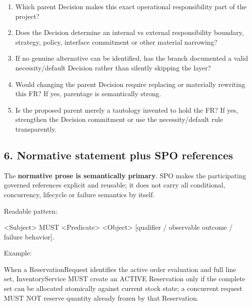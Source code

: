 \documentclass[
  10pt,
]{article}
\newenvironment{Shaded}{}{}
\newcommand{\NormalTok}[1]{#1}
\providecommand{\tightlist}{%
  \setlength{\itemsep}{0pt}\setlength{\parskip}{0pt}}
\begin{document}
\begin{enumerate}
\def\labelenumi{\arabic{enumi}.}
\tightlist
\item
  Which parent Decision makes this exact operational responsibility part
  of the project?
\item
  Does the Decision determine an internal vs external responsibility
  boundary, strategy, policy, interface commitment or other material
  narrowing?
\item
  If no genuine alternative can be identified, has the branch documented
  a valid necessity/default Decision rather than silently skipping the
  layer?
\item
  Would changing the parent Decision require replacing or materially
  rewriting this FR? If yes, parentage is semantically strong.
\item
  Is the proposed parent merely a tautology invented to hold the FR? If
  yes, strengthen the Decision commitment or use the necessity/default
  rule transparently.
\end{enumerate}

\subsection{6. Normative statement plus SPO
references}\label{6-normative-statement-plus-spo-references}

The \textbf{normative prose is semantically primary}. SPO makes the
participating governed references explicit and reusable; it does not
carry all conditional, concurrency, lifecycle or failure semantics by
itself.

Readable pattern:

\begin{Shaded}
\begin{Highlighting}[]
\NormalTok{[Condition,] \textless{}Subject\textgreater{} MUST \textless{}Predicate\textgreater{} \textless{}Object\textgreater{}}
\NormalTok{[qualifier / observable outcome / failure behavior].}
\end{Highlighting}
\end{Shaded}

Example:

\begin{Shaded}
\begin{Highlighting}[]
\NormalTok{When a ReservationRequest identifies the active order evaluation and full line set,}
\NormalTok{InventoryService MUST create an ACTIVE Reservation only if the complete set can be}
\NormalTok{allocated atomically against current stock state; a concurrent request MUST NOT reserve}
\NormalTok{quantity already frozen by that Reservation.}
\end{Highlighting}
\end{Shaded}
\end{document}
